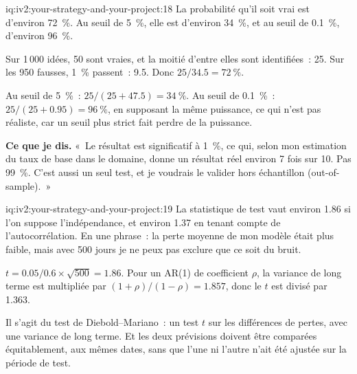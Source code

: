 \begin{solution}{iq:iv2:your-strategy-and-your-project:18}
La probabilité qu'il soit vrai est d'environ 72~\%. Au seuil de 5~\%, elle est d'environ 34~\%, et au seuil de 0.1~\%, d'environ 96~\%.

Sur 1\,000 idées, 50 sont vraies, et la moitié d'entre elles sont identifiées~: 25. Sur les 950 fausses, 1~\% passent~: 9.5. Donc $25/34.5 = 72~\%$.

Au seuil de 5~\%~: $25/(25 + 47.5) = 34~\%$. Au seuil de 0.1~\%~: $25/(25 + 0.95) = 96~\%$, en supposant la même puissance, ce qui n'est pas réaliste, car un seuil plus strict fait perdre de la puissance.

\textbf{Ce que je dis.} «~Le résultat est significatif à 1~\%, ce qui, selon mon estimation du taux de base dans le domaine, donne un résultat réel environ 7 fois sur 10. Pas 99~\%. C'est aussi un seul test, et je voudrais le valider hors échantillon (out-of-sample).~»

\end{solution}

\begin{solution}{iq:iv2:your-strategy-and-your-project:19}
La statistique de test vaut environ 1.86 si l'on suppose l'indépendance, et environ 1.37 en tenant compte de l'autocorrélation. En une phrase~: la perte moyenne de mon modèle était plus faible, mais avec 500 jours je ne peux pas exclure que ce soit du bruit.

$t = 0.05/0.6 \times \sqrt{500} = 1.86$. Pour un AR(1) de coefficient $\rho$, la variance de long terme est multipliée par $(1 + \rho)/(1 - \rho) = 1.857$, donc le $t$ est divisé par 1.363.

Il s'agit du test de Diebold--Mariano~: un test $t$ sur les différences de pertes, avec une variance de long terme. Et les deux prévisions doivent être comparées équitablement, aux mêmes dates, sans que l'une ni l'autre n'ait été ajustée sur la période de test.

\end{solution}


